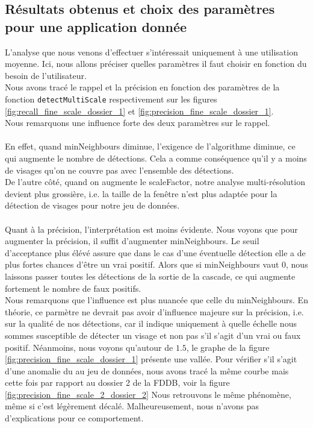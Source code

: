 \documentclass[a4paper,11pt]{article}
\begin{document}
        \subsection{Résultats obtenus et choix des paramètres pour une application donnée}

            L'analyse que nous venons d'effectuer s'intéressait uniquement à une utilisation moyenne. Ici, nous allons préciser quelles paramètres il faut choisir en fonction du besoin de l'utilisateur.
            \\
            Nous avons tracé le rappel et la précision en fonction des paramètres de la fonction \verb!detectMultiScale! respectivement sur les figures \ref{fig:recall_fine_scale_dossier_1} et \ref{fig:precision_fine_scale_dossier_1}.
            \\
            Nous remarquons une influence forte des deux paramètres sur le rappel.
            \\
            \\
            En effet, quand minNeighbours diminue, l'exigence de l'algorithme diminue, ce qui augmente le nombre de détections.
            Cela a comme conséquence qu'il y a moins de visages qu'on ne couvre pas avec l'ensemble des détections.
            \\
            De l'autre côté, quand on augmente le scaleFactor, notre analyse multi-résolution devient plus grossière, i.e. la taille de la fenêtre n'est plus adaptée pour la détection de visages pour notre jeu de données.
            \\
            \\
            Quant à la précision, l'interprétation est moins évidente.
            Nous voyons que pour augmenter la précision, il suffit d'augmenter minNeighbours.
            Le seuil d'acceptance plus élévé assure que dans le cas d'une éventuelle détection elle a de plus fortes chances d'être un vrai positif.
            Alors que si minNeighbours vaut $0$, nous laissons passer toutes les détections de la sortie de la cascade, ce qui augmente fortement le nombre de faux positifs.
            \\
            Nous remarquons que l'influence est plus nuancée que celle du minNeighbours.
            En théorie, ce parmètre ne devrait pas avoir d'influence majeure sur la précision, i.e. sur la qualité de nos détections, car il indique uniquement à quelle échelle nous sommes susceptible de détecter un visage et non pas s'il s'agit d'un vrai ou faux positif.
            Néanmoins, nous voyons qu'autour de $1.5$, le graphe de la figure \ref{fig:precision_fine_scale_dossier_1} présente une vallée.
            Pour vérifier s'il s'agit d'une anomalie du au jeu de données, nous avons tracé la même courbe mais cette fois par rapport au dossier 2 de la FDDB, voir la figure \ref{fig:precision_fine_scale_2_dossier_2}
            Nous retrouvons le même phénomène, même si c'est légèrement décalé.
            Malheureusement, nous n'avons pas d'explications pour ce comportement.
\end{document}
